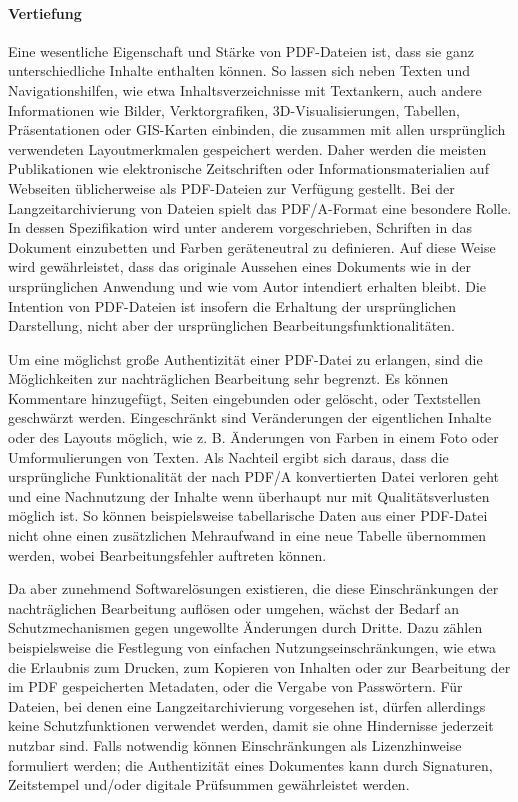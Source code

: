\paragraph{Vertiefung}
Eine wesentliche Eigenschaft und Stärke von PDF-Dateien ist, dass sie ganz unterschiedliche Inhalte enthalten können. So lassen sich neben Texten und Navigationshilfen, wie etwa Inhaltsverzeichnisse mit Textankern, auch andere Informationen wie Bilder, Verktorgrafiken, 3D-Visualisierungen, Tabellen, Präsentationen oder GIS-Karten einbinden, die zusammen mit allen ursprünglich verwendeten Layoutmerkmalen gespeichert werden. Daher werden die meisten Publikationen wie elektronische Zeitschriften oder Informationsmaterialien auf Webseiten üblicherweise als PDF-Dateien zur Verfügung gestellt. Bei der Langzeitarchivierung von Dateien spielt das PDF/A-Format eine besondere Rolle. In dessen Spezifikation wird unter anderem vorgeschrieben, Schriften in das Dokument einzubetten und Farben geräteneutral zu definieren. Auf diese Weise wird gewährleistet, dass das originale Aussehen eines Dokuments wie in der ursprünglichen Anwendung und wie vom Autor intendiert erhalten bleibt. Die Intention von PDF-Dateien ist insofern die Erhaltung der ursprünglichen Darstellung, nicht aber der ursprünglichen Bearbeitungsfunktionalitäten.

Um eine möglichst große Authentizität einer PDF-Datei zu erlangen, sind die Möglichkeiten zur nachträglichen Bearbeitung sehr begrenzt. Es können Kommentare hinzugefügt, Seiten eingebunden oder gelöscht, oder Textstellen geschwärzt werden. Eingeschränkt sind Veränderungen der eigentlichen Inhalte oder des Layouts möglich, wie z. B. Änderungen von Farben in einem Foto oder Umformulierungen von Texten. Als Nachteil ergibt sich daraus, dass die ursprüngliche Funktionalität der nach PDF/A konvertierten Datei verloren geht und eine Nachnutzung der Inhalte wenn überhaupt nur mit Qualitätsverlusten möglich ist. So können beispielsweise tabellarische Daten aus einer PDF-Datei nicht ohne einen zusätzlichen Mehraufwand in eine neue Tabelle übernommen werden, wobei Bearbeitungsfehler auftreten können.

Da aber zunehmend Softwarelösungen existieren, die diese Einschränkungen der nachträglichen Bearbeitung auflösen oder umgehen, wächst der Bedarf an Schutzmechanismen gegen ungewollte Änderungen durch Dritte. Dazu zählen beispielsweise die Festlegung von einfachen Nutzungseinschränkungen, wie etwa die Erlaubnis zum Drucken, zum Kopieren von Inhalten oder zur Bearbeitung der im PDF gespeicherten Metadaten, oder die Vergabe von Passwörtern. Für Dateien, bei denen eine Langzeitarchivierung vorgesehen ist, dürfen allerdings keine Schutzfunktionen verwendet werden, damit sie ohne Hindernisse jederzeit nutzbar sind. Falls notwendig können Einschränkungen als Lizenzhinweise formuliert werden; die Authentizität eines Dokumentes kann durch Signaturen, Zeitstempel und/oder digitale Prüfsummen gewährleistet werden.

